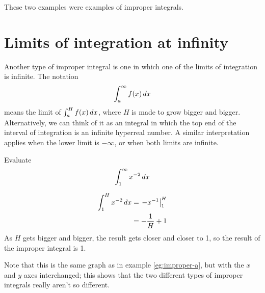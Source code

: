 
These two examples were examples of improper integrals.

\section{Limits of integration at infinity}

Another type of improper integral is one in which one of the
limits of integration is infinite. The notation
\begin{equation*}
  \int_a^\infty f(x)\mathop{d\!} x
\end{equation*}
means the limit of $\int_a^H f(x)\mathop{d\!} x$, where $H$ is
made to grow bigger and bigger. Alternatively, we can
think of it as an integral in which the top end of the
interval of integration is an infinite hyperreal number.
A similar interpretation applies when the lower limit is
$-\infty$, or when both limits are infinite.

\begin{eg}
\egquestion Evaluate
\begin{equation*}
  \int_1^\infty x^{-2}\mathop{d\!} x 
\end{equation*}

\eganswer
\begin{align*}
  \int_1^H x^{-2}\mathop{d\!} x &= \left.-x^{-1}\right|_1^H \\
               &= -\frac{1}{H}+1
\end{align*}
As $H$ gets bigger and bigger, the result gets closer and closer
to 1, so the result of the improper integral is 1.

Note that this is the same graph as in example \ref{eg:improper-a}, but with the $x$ and $y$ axes
interchanged; this shows that the two different types of improper integrals really aren't so different.
\end{eg}


